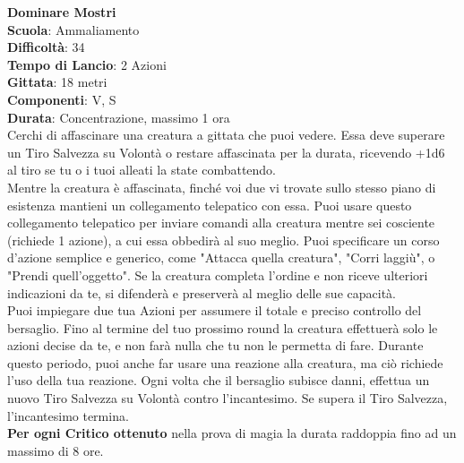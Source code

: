 \begin{multicols}{2}
\medskip\textbf{Dominare Mostri}\\
\textbf{Scuola}: Ammaliamento\\
\textbf{Difficoltà}: 34\\
\textbf{Tempo di Lancio}: 2 Azioni\\
\textbf{Gittata}: 18 metri\\
\textbf{Componenti}: V, S\\
\textbf{Durata}: Concentrazione, massimo 1 ora\\
Cerchi di affascinare una creatura a gittata che puoi vedere. Essa deve superare un Tiro Salvezza su Volontà o restare affascinata per la durata, ricevendo +1d6 al tiro se tu o i tuoi alleati la state combattendo.\\
Mentre la creatura è affascinata, finché voi due vi trovate sullo stesso piano di esistenza mantieni un collegamento telepatico con essa. Puoi usare questo collegamento telepatico per inviare comandi alla creatura mentre sei cosciente (richiede 1 azione), a cui essa obbedirà al suo meglio. Puoi specificare un corso d'azione semplice e generico, come "Attacca quella creatura", "Corri laggiù", o "Prendi quell'oggetto". Se la creatura completa l'ordine e non riceve ulteriori indicazioni da te, si difenderà e preserverà al meglio delle sue capacità.\\
Puoi impiegare due tua Azioni per assumere il totale e preciso controllo del bersaglio. Fino al termine del tuo prossimo round la creatura effettuerà solo le azioni decise da te, e non farà nulla che tu non le permetta di fare. Durante questo periodo, puoi anche far usare una reazione alla creatura, ma ciò richiede l'uso della tua reazione. Ogni volta che il bersaglio subisce danni, effettua un nuovo Tiro Salvezza su Volontà contro l'incantesimo. Se supera il Tiro Salvezza, l'incantesimo termina.\\
\textbf{Per ogni Critico ottenuto} nella prova di magia la durata raddoppia fino ad un massimo di 8 ore.


\end{multicols}
